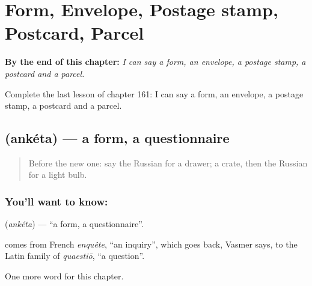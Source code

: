 
\chapter{Form, Envelope, Postage stamp, Postcard, Parcel}
\label{ch:ru-form-envelope-postage-stamp-postcard-parcel}

\begin{chapteropening}
\textbf{By the end of this chapter:} \emph{I can say a form, an envelope, a postage stamp, a postcard and a parcel.}

Complete the last lesson of chapter 161: I can say a form, an envelope, a postage stamp, a postcard and a parcel.
\end{chapteropening}

\section[\texorpdfstring{\ru{анкета} (ankéta)}{анкета (ankéta)}]{ (ankéta) — a form, a questionnaire}

\label{lesson:RU-C161-anketa}



\begin{quote}
Before the new one: say the Russian for a drawer; a crate, then the Russian for a light bulb.
\end{quote}

\subsection*{You'll want to know: }
\textbf{} (\emph{ankéta}) — \textquotedblleft{}a form, a questionnaire\textquotedblright{}.

\begin{cousinweb}
\textbf{} comes from French \emph{enquête}, \textquotedblleft{}an inquiry\textquotedblright{}, which goes back, Vasmer says, to the Latin family of \emph{quaestiō}, \textquotedblleft{}a question\textquotedblright{}.
\end{cousinweb}

\begin{grammarlens}[title={What you've built}]
One more word for this chapter.
\end{grammarlens}

